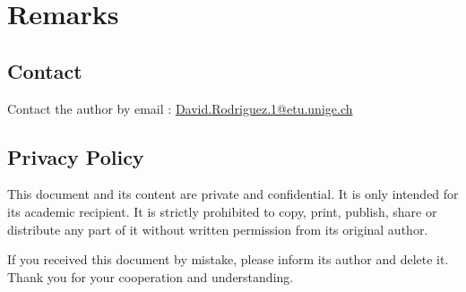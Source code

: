 \documentclass[11pt]{article}
\begin{document}
\newpage
\section{Remarks}

\subsection{Contact}

Contact the author by email : \href{mailto:David.Rodriguez.1@etu.unige.ch}{David.Rodriguez.1@etu.unige.ch}

\subsection{Privacy Policy}
\label{sec:privacypolice}

This document and its content are private and confidential. It is only intended for its academic recipient. It is strictly prohibited to copy, print, publish, share or distribute any part of it without written permission from its original author.

If you received this document by mistake, please inform its author and delete it. Thank you for your cooperation and understanding.
\end{document}
